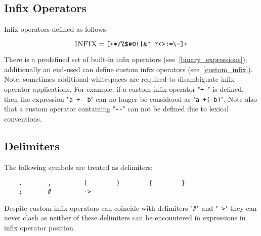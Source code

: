 \subsection{Infix Operators}

Infix operators defined as follows:

\[
\textsc{INFIX}=\mbox{\texttt{[+*/\%\$\#@!|\&\^{}~?<>:=\textbackslash-]+}}
\]

There is a predefined set of built-in infix operators (see~\ref{binary_expressions}); additionally
an end-used can define custom infix operators (see~\ref{custom_infix}). Note, sometimes 
additional whitespaces are required to disambiguate infix operator applications. For example, if a
custom infix operator "\lstinline|+-|" is defined, then the expression "\lstinline|a +- b|" can no longer be
considered as "\lstinline|a +(-b)|". Note also that a custom operator containing "\lstinline|--|" can not be
defined due to lexical conventions.

\subsection{Delimiters}

The following symbols are treated as delimiters:

\begin{lstlisting}
    .       ,         (        )        {        }
    ;       #         ->
\end{lstlisting}

Despite custom infix operators can coincide with delimiters "\lstinline|#|" and "\lstinline|->|" they can
never clash as neither of these delimiters can be encountered in expressions in infix operator position.


